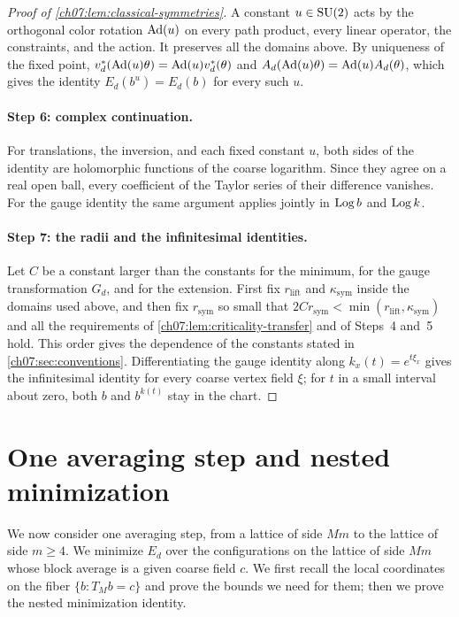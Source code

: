 \begin{proof}[Proof of \cref{ch07:lem:classical-symmetries}]
A constant $u\in\mathrm{SU}(2)$ acts by the orthogonal color rotation $\operatorname{Ad}(u)$ on every path product, every linear operator, the constraints, and the action. It preserves all the domains above. By uniqueness of the fixed point, $v_d^*(\operatorname{Ad}(u)\theta)=\operatorname{Ad}(u)v_d^*(\theta)$ and $A_d(\operatorname{Ad}(u)\theta)=\operatorname{Ad}(u)A_d(\theta)$, which gives the identity $E_d(b^u)=E_d(b)$ for every such $u$.

\paragraph{Step 6: complex continuation.}
For translations, the inversion, and each fixed constant $u$, both sides of the identity are holomorphic functions of the coarse logarithm. Since they agree on a real open ball, every coefficient of the Taylor series of their difference vanishes. For the gauge identity the same argument applies jointly in $\operatorname{Log} b$ and $\operatorname{Log} k$.

\paragraph{Step 7: the radii and the infinitesimal identities.}
Let $C$ be a constant larger than the constants for the minimum, for the gauge transformation $G_d$, and for the extension. First fix $r_{\mathrm{lift}}$ and $\kappa_{\mathrm{sym}}$ inside the domains used above, and then fix $r_{\mathrm{sym}}$ so small that $2Cr_{\mathrm{sym}}<\min(r_{\mathrm{lift}},\kappa_{\mathrm{sym}})$ and all the requirements of \cref{ch07:lem:criticality-transfer} and of Steps~4 and~5 hold. This order gives the dependence of the constants stated in \cref{ch07:sec:conventions}. Differentiating the gauge identity along $k_x(t)=e^{t\xi_x}$ gives the infinitesimal identity for every coarse vertex field $\xi$; for $t$ in a small interval about zero, both $b$ and $b^{k(t)}$ stay in the chart.
\end{proof}

\section{One averaging step and nested minimization}\label{ch07:sec:nested}

We now consider one averaging step, from a lattice of side $Mm$ to the lattice of side $m\ge4$. We minimize $E_d$ over the configurations on the lattice of side $Mm$ whose block average is a given coarse field $c$. We first recall the local coordinates on the fiber $\{b:T_Mb=c\}$ and prove the bounds we need for them; then we prove the nested minimization identity.

